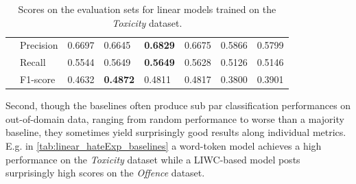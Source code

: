 \begin{table}[]
\begin{minipage}{0.42\paperheight}
{\begin{tabular}{ll|ll|ll|ll}
                                        & Precision & 0.6697 & 0.6645            & \bf{0.6829} & 0.6675      & 0.5866 & 0.5799          \\
                                        & Recall    & 0.5544 & 0.5649            & \bf{0.5649} & 0.5628      & 0.5126 & 0.5146          \\
                                        & F1-score  & 0.4632 & \bf{0.4872}       & 0.4811      & 0.4817      & 0.3800 & 0.3901
    \end{tabular}%
    }
    \caption{Scores on the evaluation sets for linear models trained on the \textit{Toxicity} dataset.}
    \label{tab:linear_toxicity_baselines}
    \end{minipage}
\end{table}

Second, though the baselines often produce sub par classification performances on out-of-domain data, ranging from random performance to worse than a majority baseline, they sometimes yield surprisingly good results along individual metrics. E.g. in \cref{tab:linear_hateExp_baselines} a word-token model achieves a high performance on the \textit{Toxicity} dataset while a LIWC-based model posts surprisingly high scores on the \textit{Offence} dataset.

